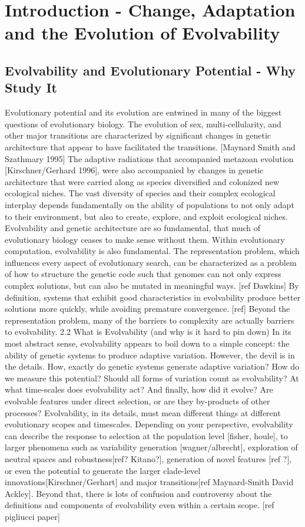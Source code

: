 \section{Introduction - Change, Adaptation and the Evolution of Evolvability}
\subsection{Evolvability and Evolutionary Potential - Why Study It} 
Evolutionary potential and its evolution are entwined in many of the biggest questions of evolutionary biology. The evolution of sex, multi-cellularity, and other major transitions are characterized by significant changes in genetic architecture that appear to have facilitated the transitions. [Maynard Smith and Szathmary 1995] The adaptive radiations that accompanied metazoan evolution [Kirschner/Gerhard 1996], were also accompanied by changes in genetic architecture that were carried along as species diversified and colonized new ecological niches. The vast diversity of species and their complex ecological interplay depends fundamentally on the ability of populations to not only adapt to their environment, but also to create, explore, and exploit ecological niches. Evolvability and genetic architecture are so fundamental, that much of evolutionary biology ceases to make sense without them. 
Within evolutionary computation, evolvability is also fundamental. The representation problem, which influences every aspect of evolutionary search, can be characterized as a problem of how to structure the genetic code such that genomes can not only express complex solutions, but can also be mutated in meaningful ways. [ref Dawkins] By definition, systems that exhibit good characteristics in evolvability produce better solutions more quickly, while avoiding premature convergence. [ref] Beyond the representation problem, many of the barriers to complexity are actually barriers to evolvability.
2.2 What is Evolvability (and why is it hard to pin down)
In its most abstract sense, evolvability appears to boil down to a simple concept: the ability of genetic systems to produce adaptive variation. However, the devil is in the details.  How, exactly do genetic systems generate adaptive variation? How do we measure this potential? Should all forms of variation count as evolvability? At what time-scales does evolvability act?  And finally, how did it evolve? Are evolvable features under direct selection, or are they by-products of other processes?
Evolvability, in its details, must mean different things at different evolutionary scopes and timescales. Depending on your perspective, evolvability can describe the response to selection at the population level [fisher, houle], to larger phenomena such as variability generation [wagner/albrecht], exploration of neutral spaces and robustness[ref? Kitano?], generation of novel features [ref ?], or even the potential to generate the larger clade-level innovations[Kirschner/Gerhart] and major transitions[ref Maynard-Smith David Ackley]. Beyond that, there is lots of confusion and controversy about the definitions and components of evolvability even within a certain scope. [ref pigliucci paper]
